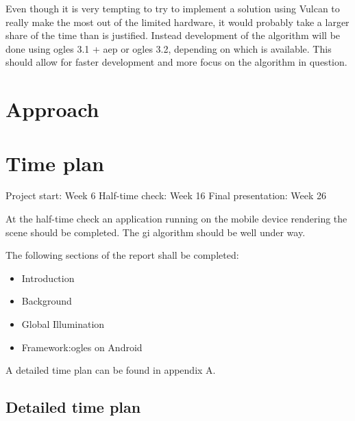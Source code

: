 \documentclass[a4paper, 12pt]{article}
\begin{document}
Even though it is very tempting to try to implement a solution using Vulcan to really make the most out of the limited hardware, it would probably take a larger share of the time than is justified. Instead development of the algorithm will be done using \gls{ogles} 3.1 + \gls{aep} or \gls{ogles} 3.2, depending on which is available. This should allow for faster development and more focus on the algorithm in question.


\section{Approach}
\label{sec:Approach}


\section{Time plan}
\label{sec:Time plan}

Project start: Week 6
Half-time check: Week 16
Final presentation: Week 26

At the half-time check an application running on the mobile device rendering the scene should be completed. The \gls{gi} algorithm should be well under way.

The following sections of the report shall be completed:
\begin{itemize}
  \item Introduction
  \item Background
  \item Global Illumination
  \item Framework:\@ \gls{ogles} on Android
\end{itemize}

A detailed time plan can be found in appendix A\@.




\newpage

\begin{appendices}

\section{Detailed time plan}
\label{app:timeplan}

\end{appendices}
\end{document}
